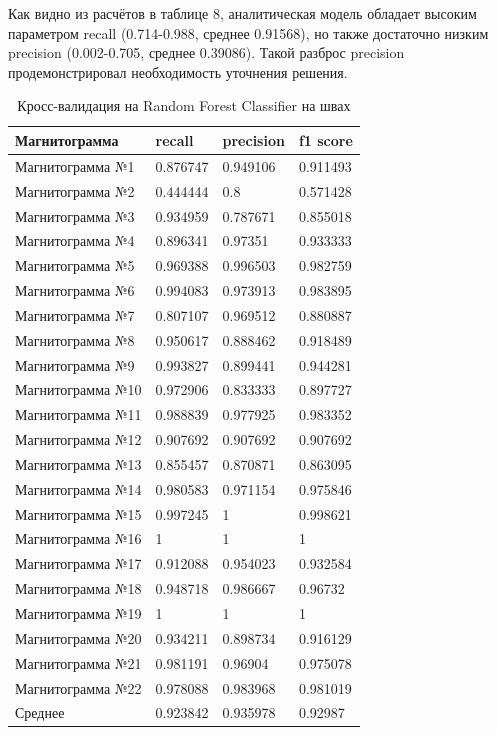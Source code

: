 \documentclass[a4paper,article,14pt]{extarticle}
\begin{document}
Как видно из расчётов в таблице 8, аналитическая модель обладает высоким параметром recall (0.714-0.988, среднее 0.91568), но также достаточно низким precision (0.002-0.705, среднее 0.39086). 
Такой разброс precision продемонстрировал необходимость уточнения решения.

\begin{center}
    \begin{longtable}{|p{5cm}|p{3cm}|p{3cm}|p{3cm}|}
        \caption{Кросс-валидация на Random Forest Classifier на швах}\\\hline
        Магнитограмма & recall & precision & f1 score \\ \hline
        Магнитограмма №1 & 0.876747 & 0.949106 & 0.911493 \\ \hline
        Магнитограмма №2 & 0.444444 & 0.8 & 0.571428 \\ \hline
        Магнитограмма №3 & 0.934959 & 0.787671 & 0.855018 \\ \hline
        Магнитограмма №4 & 0.896341 & 0.97351 & 0.933333 \\ \hline
        Магнитограмма №5 & 0.969388 & 0.996503 & 0.982759 \\ \hline
        Магнитограмма №6 & 0.994083 & 0.973913 & 0.983895 \\ \hline
        Магнитограмма №7 & 0.807107 & 0.969512 & 0.880887 \\ \hline
        Магнитограмма №8 & 0.950617 & 0.888462 & 0.918489 \\ \hline
        Магнитограмма №9 & 0.993827 & 0.899441 & 0.944281 \\ \hline
        Магнитограмма №10 & 0.972906 & 0.833333 & 0.897727 \\ \hline
        Магнитограмма №11 & 0.988839 & 0.977925 & 0.983352 \\ \hline
        Магнитограмма №12 & 0.907692 & 0.907692 & 0.907692 \\ \hline
        Магнитограмма №13 & 0.855457 & 0.870871 & 0.863095 \\ \hline
        Магнитограмма №14 & 0.980583 & 0.971154 & 0.975846 \\ \hline
        Магнитограмма №15 & 0.997245 & 1 & 0.998621 \\ \hline
        Магнитограмма №16 & 1 & 1 & 1 \\ \hline
        Магнитограмма №17 & 0.912088 & 0.954023 & 0.932584 \\ \hline
        Магнитограмма №18 & 0.948718 & 0.986667 & 0.96732 \\ \hline
        Магнитограмма №19 & 1 & 1 & 1 \\ \hline
        Магнитограмма №20 & 0.934211 & 0.898734 & 0.916129 \\ \hline
        Магнитограмма №21 & 0.981191 & 0.96904 & 0.975078 \\ \hline
        Магнитограмма №22 & 0.978088 & 0.983968 & 0.981019 \\ \hline
        Среднее & 0.923842 & 0.935978 & 0.92987 \\ \hline
    \end{longtable}
\end{center}
\end{document}
